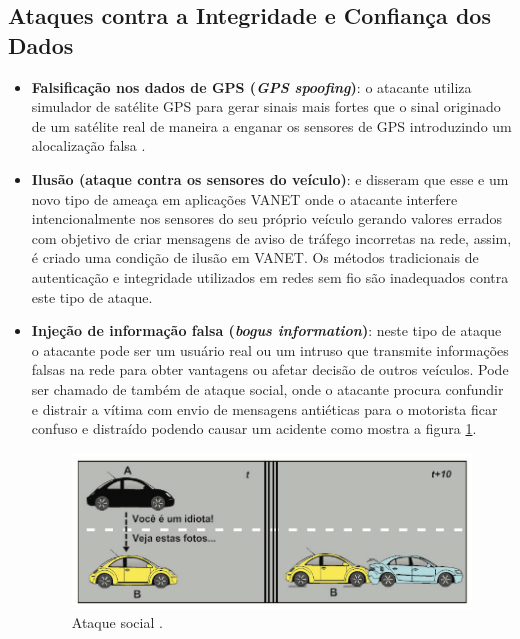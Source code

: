 \documentclass[
	12pt,				%
	oneside,			%
	a4paper,			%
	english,			%
	brazil				%
	]{abntex2ppgsi}
\begin{document}
\subsection{Ataques contra a Integridade e Confiança dos Dados}

\begin{itemize}
	\item {\textbf{Falsificação nos dados de GPS (\textit{GPS spoofing})}: o atacante utiliza simulador de satélite GPS para gerar sinais  mais fortes que o sinal originado de um satélite real de maneira a enganar os sensores de GPS introduzindo um alocalização falsa \cite{rawat2012vanet}.}
	
	\item {\textbf{Ilusão (ataque contra os sensores do veículo)}:  e  disseram que esse e um novo tipo de ameaça em aplicações VANET onde o atacante interfere intencionalmente  nos sensores do seu próprio veículo gerando valores errados com objetivo de criar mensagens de aviso de tráfego incorretas na rede, assim, é criado uma condição de ilusão em VANET. Os métodos tradicionais de autenticação e integridade utilizados em redes sem fio são inadequados contra este tipo de ataque.}
	
	\item {\textbf{Injeção de informação falsa (\textit{bogus information})}: neste tipo de ataque o atacante pode ser um usuário real ou um intruso que transmite informações falsas na rede para obter vantagens  ou afetar decisão de outros veículos. Pode ser chamado de também de ataque social, onde o atacante  procura confundir e distrair a vítima  com envio de mensagens antiéticas para o motorista ficar confuso e distraído podendo causar um acidente como mostra a figura  \ref{fig:ataquesocial}.	}
	
\begin{figure}[!h]
	\centering
	\includegraphics [width=12cm] {images/ataquesocial.png}
	\caption{Ataque social \cite{wanghamsegurancca}.}
	\label{fig:ataquesocial}
\end{figure}	


\end{itemize}
\end{document}
